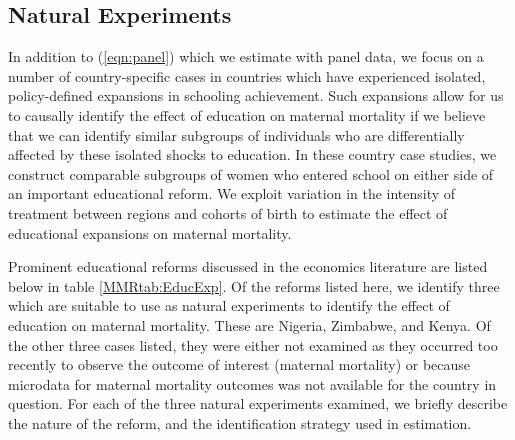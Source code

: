 \documentclass{article}[12pt,subeqn]
\begin{document}
\begin{spacing}{1.4}
\subsection{Natural Experiments}
\label{scn:empiricalexperiment}
In addition to (\ref{eqn:panel}) which we estimate with panel data, we focus on a 
number of country-specific cases in countries which have experienced isolated, 
policy-defined expansions in schooling achievement. Such expansions allow for us 
to causally identify the effect of education on maternal mortality if we believe 
that we can identify similar subgroups of individuals who are differentially 
affected by these isolated shocks to education. In these country case studies, we 
construct comparable subgroups of women who entered school on either side of an 
important educational reform.  We exploit variation in the intensity of treatment 
between regions and cohorts of birth to estimate the effect of educational 
expansions on maternal mortality.

Prominent educational reforms discussed in the economics literature are listed 
below in table \ref{MMRtab:EducExp}.  Of the reforms listed here, we identify 
three which are suitable to use as natural experiments to identify the effect of 
education on maternal mortality.  These are Nigeria, Zimbabwe, and Kenya. Of the 
other three cases listed, they were either not examined as they occurred too 
recently to observe the outcome of interest (maternal mortality) or because 
microdata for maternal mortality outcomes was not available for the country in 
question. For each of the three natural experiments examined, we briefly describe 
the nature of the reform, and the identification strategy used in estimation.


\end{spacing}
\end{document}
